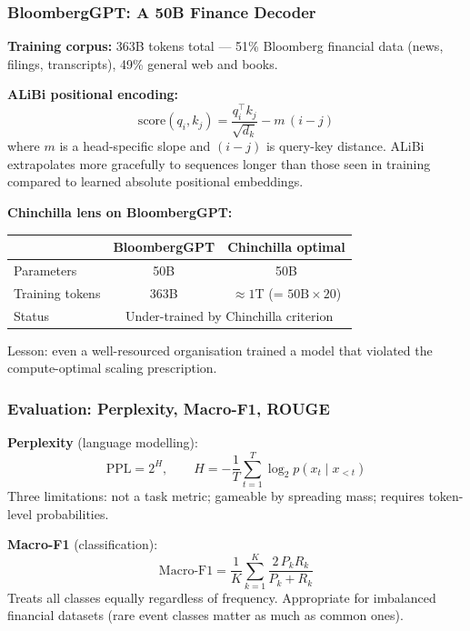 \documentclass[9pt,t]{beamer}
\begin{document}
\begin{frame}
\frametitle{BloombergGPT: A 50B Finance Decoder}

\textbf{Training corpus:} 363B tokens total --- 51\% Bloomberg financial data
(news, filings, transcripts), 49\% general web and books.

\medskip
\textbf{ALiBi positional encoding:}
\[
  \text{score}(q_i, k_j) = \frac{q_i^\top k_j}{\sqrt{d_k}} - m\,(i - j)
\]
where $m$ is a head-specific slope and $(i-j)$ is query-key distance.
ALiBi extrapolates more gracefully to sequences longer than those seen in training
compared to learned absolute positional embeddings.

\medskip
\textbf{Chinchilla lens on BloombergGPT:}

\begin{center}
\begin{tabular}{lcc}
\toprule
 & BloombergGPT & Chinchilla optimal \\
\midrule
Parameters     & 50B   & 50B \\
Training tokens & 363B & $\approx 1$T (= $50\text{B} \times 20$) \\
Status         & \multicolumn{2}{c}{Under-trained by Chinchilla criterion} \\
\bottomrule
\end{tabular}
\end{center}

\medskip
Lesson: even a well-resourced organisation trained a model that violated the
compute-optimal scaling prescription.
\end{frame}

\begin{frame}
\frametitle{Evaluation: Perplexity, Macro-F1, ROUGE}

\textbf{Perplexity} (language modelling):
\[
  \text{PPL} = 2^{H}, \qquad H = -\frac{1}{T}\sum_{t=1}^{T} \log_2 p(x_t \mid x_{<t})
\]
Three limitations: not a task metric; gameable by spreading mass; requires
token-level probabilities.

\medskip
\textbf{Macro-F1} (classification):
\[
  \text{Macro-F1} = \frac{1}{K}\sum_{k=1}^{K} \frac{2\,P_k R_k}{P_k + R_k}
\]
Treats all classes equally regardless of frequency. Appropriate for imbalanced
financial datasets (rare event classes matter as much as common ones).
\end{frame}
\end{document}
